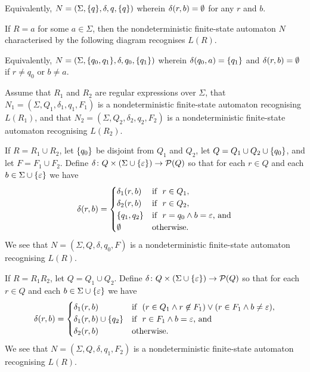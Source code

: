   \noindent Equivalently, \(N = (\Sigma, \{q\}, \delta, q, \{q\})\) wherein \(\delta(r, b) = \emptyset\) for any \(r\)
  and \(b\).

  If \(R = a\) for some \(a \in \Sigma\), then the nondeterministic finite-state automaton \(N\) characterised by the
  following diagram recognises \(L(R)\).
  \begin{figure}[!ht]
    \centering
  \end{figure}

  \noindent Equivalently, \(N = (\Sigma, \{q_0, q_1\}, \delta, q_0, \{q_1\})\) wherein \(\delta(q_0, a)
  = \{q_1\}\) and \(\delta(r, b) = \emptyset\) if \(r \neq q_0\) or \(b \neq a\).

  Assume that \(R_1\) and \(R_2\) are regular expressions over \(\Sigma\), that \(N_1 = (\Sigma, Q_1, \delta_1, q_1,
  F_1)\) is a nondeterministic finite-state automaton recognising \(L(R_1)\), and that \(N_2 = (\Sigma, Q_2, \delta_2,
  q_2, F_2)\) is a nondeterministic finite-state automaton recognising \(L(R_2)\).

  If \(R = R_1 \cup R_2\), let \(\{q_0\}\) be disjoint from \(Q_1\) and \(Q_2\), let \(Q = Q_1 \cup Q_2
  \cup \{q_0\}\), and let \(F = F_1 \cup F_2\). Define \(\delta\colon Q \times (\Sigma \cup
  \{\varepsilon\})\to\mathcal{P}(Q)\) so that for each \(r \in Q\) and each \(b \in \Sigma \cup \{\varepsilon\}\) we have
  \[
    \delta(r, b) = \begin{cases}
      \delta_1(r, b) & \text{if }\ r \in Q_1,\\
      \delta_2(r, b) & \text{if }\ r \in Q_2,\\
      \{q_1, q_2\} & \text{if }\ r = q_0 \land b = \varepsilon \text{, and}\\
      \emptyset & \text{otherwise.}
    \end{cases}
  \]
  We see that \(N = (\Sigma, Q, \delta, q_0, F)\) is a nondeterministic finite-state automaton recognising \(L(R)\).

  If \(R = R_1 R_2\), let \(Q = Q_1 \cup Q_2\). Define \(\delta\colon Q \times (\Sigma
  \cup \{\varepsilon\})\to\mathcal{P}(Q)\) so that for each \(r \in Q\) and each \(b \in \Sigma \cup \{\varepsilon\}\) we
  have
  \[
    \delta(r, b) = \begin{cases}
      \delta_1(r, b) & \text{if }\ (r \in Q_1 \land r \not\in F_1) \lor (r \in F_1 \land b \neq \varepsilon),\\
      \delta_1(r, b) \cup \{q_2\} & \text{if }\ r \in F_1 \land b = \varepsilon \text{, and}\\
      \delta_2(r, b) & \text{otherwise.}
    \end{cases}
  \]
  We see that \(N = (\Sigma, Q, \delta, q_1, F_2)\) is a nondeterministic finite-state automaton recognising \(L(R)\).

